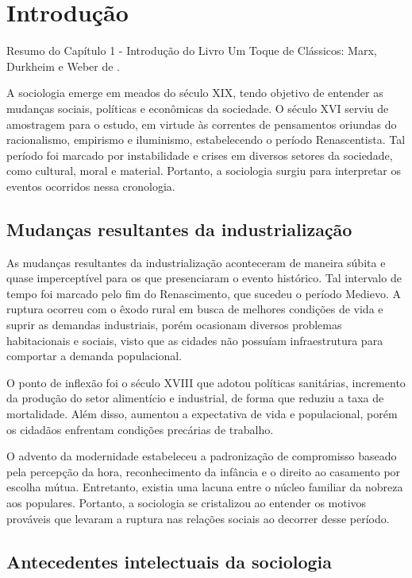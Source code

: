 \section{Introdução}

Resumo do Capítulo 1 - Introdução do Livro Um Toque de Clássicos: Marx, Durkheim e Weber de .


A sociologia emerge em meados do século XIX, tendo objetivo de entender as mudanças sociais, políticas e econômicas da sociedade.
O século XVI serviu de amostragem para o estudo, em virtude às correntes de pensamentos oriundas do racionalismo, empirismo e iluminismo, estabelecendo o período Renascentista.
Tal período foi marcado por instabilidade e crises em diversos setores da sociedade, como cultural, moral e material.
Portanto, a sociologia surgiu para interpretar os eventos ocorridos nessa cronologia.



\subsection{Mudanças resultantes da industrialização}

As mudanças resultantes da industrialização aconteceram de maneira súbita e quase imperceptível para os que presenciaram o evento histórico.
Tal intervalo de tempo foi marcado pelo fim do Renascimento, que sucedeu o período Medievo.
A ruptura ocorreu com o êxodo rural em busca de melhores condições de vida e suprir as demandas industriais, porém ocasionam diversos problemas habitacionais e sociais, visto que as cidades não possuíam infraestrutura para comportar a demanda populacional.

O ponto de inflexão foi o século XVIII que adotou políticas sanitárias, incremento da produção do setor alimentício e industrial, de forma que reduziu a taxa de mortalidade. 
Além disso, aumentou a expectativa de vida e populacional, porém os cidadãos enfrentam condições precárias de trabalho.

O advento da modernidade estabeleceu a padronização de compromisso baseado pela percepção da hora, reconhecimento da infância e o direito ao casamento por escolha mútua.
Entretanto, existia uma lacuna entre o núcleo familiar da nobreza aos populares.
Portanto, a sociologia se cristalizou ao entender os motivos prováveis que levaram a ruptura nas relações sociais ao decorrer desse período.



\subsection{Antecedentes intelectuais da sociologia}

